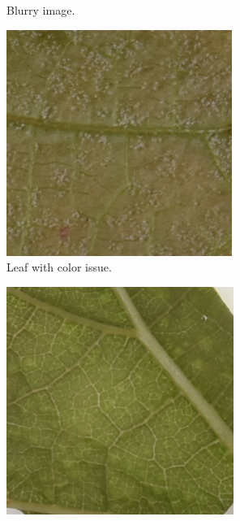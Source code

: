 \documentclass[english]{article}
\begin{document}
\begin{figure}[H]
\begin{subfigure}[b]{0.3\linewidth}
        \caption{Blurry image.}\label{fig:issueblur}
    \end{subfigure}
    \begin{subfigure}[b]{0.3\linewidth}
        \includegraphics[width=\linewidth]{Exp21DM03_inoc3_T4_P32_c_1.png}
        \caption{Leaf with color issue.}\label{fig:issuecolor}
    \end{subfigure}
    \begin{subfigure}[b]{0.3\linewidth}
        \includegraphics[width=\linewidth]{Exp21DM13_inoc2_T0_P34_b_1.png}

\end{subfigure}
\end{figure}
\end{document}
